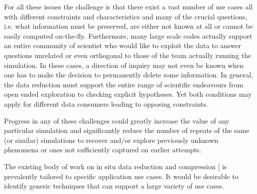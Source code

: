 \begin{refsection}
For all these issues the challenge is that there exist a vast number of use cases all with different constraints and characteristics and many of the crucial questions, i.e. what information must be preserved, are either not known at all or cannot be easily computed on-the-fly. Furthermore, many large scale codes actually support an entire community of scientist who would like to exploit the data to answer questions unrelated or even orthogonal to those of the team actually running the simulation. In these cases, a direction of inquiry may not even be known when one has to make the decision to permanently delete some information. In general, the data reduction must support the entire range of scientific endeavours from open ended exploration to checking explicit hypotheses. Yet both conditions may apply for different data consumers leading to opposing constraints.

Progress in any of these challenges could greatly increase the value of any particular simulation and significantly reduce the number of repeats of the same (or similar) simulations to recover and/or explore previously unknown phenomena or ones not sufficiently captured on earlier attempts. 

The existing body of work on in situ data reduction and compression [ is prevalently tailored to specific application use cases. It would be desirable to identify generic techniques that can support a large variety of use cases.


\printbibliography[heading=bibliography]
\end{refsection}

